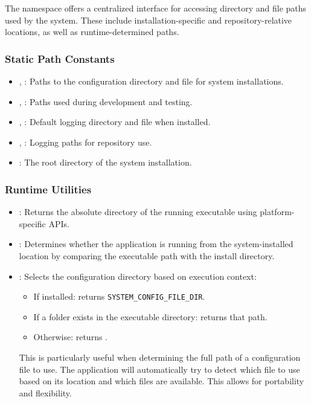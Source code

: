 The  namespace offers a centralized interface for accessing directory and file paths used by the system. These include installation-specific and repository-relative locations, as well as runtime-determined paths.

\subsubsection{Static Path Constants}
\begin{itemize}\itemsep0em
	\item {}, : Paths to the configuration directory and file for system installations.
	\item {}, : Paths used during development and testing.
	\item {}, : Default logging directory and file when installed.
	\item {}, : Logging paths for repository use.
	\item {}: The root directory of the system installation.
\end{itemize}

\subsubsection{Runtime Utilities} \label{section:global_constants_utilities}
\begin{itemize}\itemsep0em
	\item {}: Returns the absolute directory of the running executable using platform-specific APIs.

	\item {}: Determines whether the application is running from the system-installed location by comparing the executable path with the install directory.

	\item {}: Selects the configuration directory based on execution context:
	\begin{itemize}\itemsep0em
		\item If installed: returns \texttt{SYSTEM\_CONFIG\_FILE\_DIR}.
		\item If a  folder exists in the executable directory: returns that path.
		\item Otherwise: returns .
	\end{itemize}
	This is particularly useful when determining the full path of a configuration file to use. The application will automatically try to detect which file to use based on its location and which files are available. This allows for portability and flexibility.
\end{itemize}

